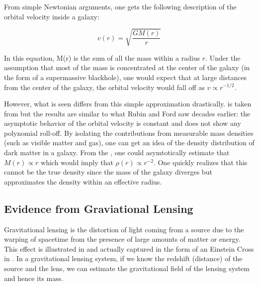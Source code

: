 	From simple Newtonian arguments, one gets the following description of the orbital velocity inside a galaxy:
	
\begin{equation}
v(r) = \sqrt{\frac{G M(r)}{r}}
\end{equation}	

In this equation, M(r) is the sum of all the mass within a radius $r$.  Under the assumption that most of the mass is concentrated at the center of the galaxy (in the form of a supermassive blackhole), one would expect that at large distances from the center of the galaxy, the orbital velocity would fall off as $v \propto r^{-1/2}$.

However, what is seen differs from this simple approximation drastically.   is taken from  but the results are similar to what Rubin and Ford saw decades earlier: the asymptotic behavior of the orbital velocity is constant and does not show any polynomial roll-off.  By isolating the contributions from measurable mass densities (such as visible matter and gas), one can get an idea of the density distribution of dark matter in a galaxy.  From the , one could asymtotically estimate that $M(r) \propto r$ which would imply that $\rho(r) \propto r^{-2}$.  One quickly realizes that this cannot be the true density since the mass of the galaxy diverges but approximates the density within an effective radius.



\subsection{Evidence from Graviational Lensing}	

Gravitational lensing is the distortion of light coming from a source due to the warping of spacetime from the presence of large amounts of matter or energy.  This effect is illustrated in  and actually captured in the form of an Einstein Cross in .  In a gravitational lensing system, if we know the redshift (distance) of the source and the lens, we can estimate the gravitational field of the lensing system and hence its mass.



